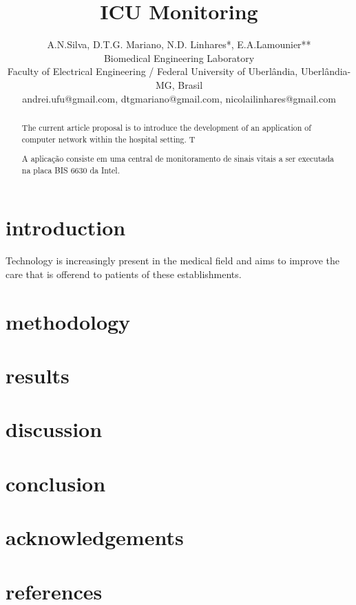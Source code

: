 \documentclass[a4paper,11pt]{article}
\title{ICU Monitoring }
\author{A.N.Silva, D.T.G. Mariano, N.D. Linhares*, E.A.Lamounier**\\Biomedical Engineering Laboratory\\ Faculty of Electrical Engineering / Federal University of Uberlândia, Uberlândia-MG, Brasil\\andrei.ufu@gmail.com, dtgmariano@gmail.com, nicolailinhares@gmail.com}
\begin{document}
\maketitle
\tableofcontents

\begin{abstract}
The current article proposal is to introduce the development of an application of computer network within the hospital setting. T

A aplicação consiste em uma central de monitoramento de sinais vitais a ser executada na placa BIS 6630 da Intel.
\end{abstract}

\section{introduction}
Technology is increasingly present in the medical field and aims to improve the care that is offerend to patients of these establishments.
\section{methodology}

\section{results}

\section{discussion}

\section{conclusion}

\section{acknowledgements}

\section{references}
\end{document}
